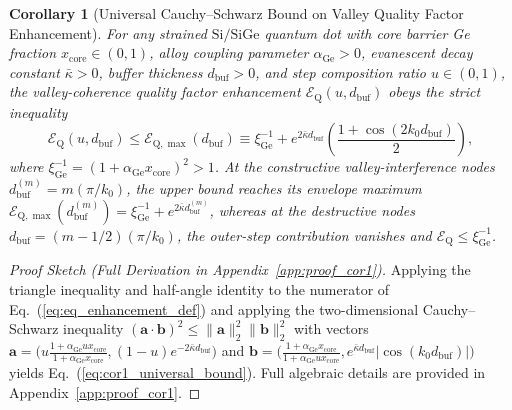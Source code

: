 \documentclass[11pt,letterpaper]{article}
\newtheorem{corollary}{Corollary}
\theoremstyle{definition}
\begin{document}
\begin{corollary}[Universal Cauchy--Schwarz Bound on Valley Quality Factor Enhancement]
\label{cor:valley_quality_bound}
For any strained $\mathrm{Si/SiGe}$ quantum dot with core barrier Ge fraction $x_{\mathrm{core}} \in (0,1)$, alloy coupling parameter $\alpha_{\mathrm{Ge}} > 0$, evanescent decay constant $\bar{\kappa} > 0$, buffer thickness $d_{\mathrm{buf}} > 0$, and step composition ratio $u \in (0,1)$, the valley-coherence quality factor enhancement $\mathcal{E}_{\mathrm{Q}}(u, d_{\mathrm{buf}})$ obeys the strict inequality
\begin{equation}
  \mathcal{E}_{\mathrm{Q}}(u, d_{\mathrm{buf}}) \le \mathcal{E}_{\mathrm{Q},\max}(d_{\mathrm{buf}}) \equiv \xi_{\mathrm{Ge}}^{-1} + e^{2\bar{\kappa} d_{\mathrm{buf}}} \left( \frac{1 + \cos(2k_0 d_{\mathrm{buf}})}{2} \right),
  \label{eq:cor1_universal_bound}
\end{equation}
where $\xi_{\mathrm{Ge}}^{-1} = (1 + \alpha_{\mathrm{Ge}} x_{\mathrm{core}})^2 > 1$. At the constructive valley-interference nodes $d_{\mathrm{buf}}^{(m)} = m(\pi/k_0)$, the upper bound reaches its envelope maximum $\mathcal{E}_{\mathrm{Q},\max}(d_{\mathrm{buf}}^{(m)}) = \xi_{\mathrm{Ge}}^{-1} + e^{2\bar{\kappa} d_{\mathrm{buf}}^{(m)}}$, whereas at the destructive nodes $d_{\mathrm{buf}} = (m - 1/2)(\pi/k_0)$, the outer-step contribution vanishes and $\mathcal{E}_{\mathrm{Q}} \le \xi_{\mathrm{Ge}}^{-1}$.
\end{corollary}

\begin{proof}[Proof Sketch (Full Derivation in Appendix~\ref{app:proof_cor1})]
Applying the triangle inequality and half-angle identity to the numerator of Eq.~(\ref{eq:eq_enhancement_def}) and applying the two-dimensional Cauchy--Schwarz inequality $(\mathbf{a}\cdot\mathbf{b})^2 \le \|\mathbf{a}\|_2^2 \|\mathbf{b}\|_2^2$ with vectors $\mathbf{a} = \bigl(u \frac{1 + \alpha_{\mathrm{Ge}} u x_{\mathrm{core}}}{1 + \alpha_{\mathrm{Ge}} x_{\mathrm{core}}}, (1-u)e^{-2\bar{\kappa} d_{\mathrm{buf}}}\bigr)$ and $\mathbf{b} = \bigl(\frac{1 + \alpha_{\mathrm{Ge}} x_{\mathrm{core}}}{1 + \alpha_{\mathrm{Ge}} u x_{\mathrm{core}}}, e^{\bar{\kappa} d_{\mathrm{buf}}}|\cos(k_0 d_{\mathrm{buf}})|\bigr)$ yields Eq.~(\ref{eq:cor1_universal_bound}). Full algebraic details are provided in Appendix~\ref{app:proof_cor1}.
\end{proof}
\end{document}
